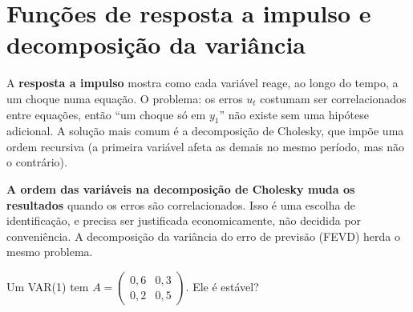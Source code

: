 \section{Funções de resposta a impulso e decomposição da variância}
A \textbf{resposta a impulso} mostra como cada variável reage, ao longo do tempo, a um choque numa equação. O problema: os erros $u_t$ costumam ser correlacionados entre equações, então ``um choque só em $y_1$'' não existe sem uma hipótese adicional. A solução mais comum é a decomposição de Cholesky, que impõe uma ordem recursiva (a primeira variável afeta as demais no mesmo período, mas não o contrário).

\begin{atencao}
\textbf{A ordem das variáveis na decomposição de Cholesky muda os resultados} quando os erros são correlacionados. Isso é uma escolha de identificação, e precisa ser justificada economicamente, não decidida por conveniência. A decomposição da variância do erro de previsão (FEVD) herda o mesmo problema.
\end{atencao}

\begin{exercicio}
Um VAR(1) tem $A=\begin{pmatrix}0{,}6&0{,}3\\0{,}2&0{,}5\end{pmatrix}$. Ele é estável?
\end{exercicio}
